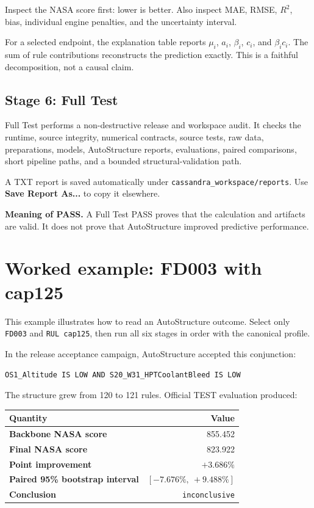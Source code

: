 \documentclass[11pt,a4paper]{article}
\begin{document}
Inspect the NASA score first: lower is better. Also inspect MAE, RMSE, $R^2$,
bias, individual engine penalties, and the uncertainty interval.

For a selected endpoint, the explanation table reports $\mu_i$, $a_i$,
$\beta_i$, $c_i$, and $\beta_i c_i$. The sum of rule contributions reconstructs
the prediction exactly. This is a faithful decomposition, not a causal claim.

\subsection{Stage 6: Full Test}

Full Test performs a non-destructive release and workspace audit. It checks the
runtime, source integrity, numerical contracts, source tests, raw data,
preparations, models, AutoStructure reports, evaluations, paired comparisons,
short pipeline paths, and a bounded structural-validation path.

A TXT report is saved automatically under \texttt{cassandra\_workspace/reports}.
Use \textbf{Save Report As...} to copy it elsewhere.

\begin{warningbox}
\textbf{Meaning of PASS.} A Full Test PASS proves that the calculation and
artifacts are valid. It does not prove that AutoStructure improved predictive
performance.
\end{warningbox}

\clearpage
\section{Worked example: FD003 with cap125}

This example illustrates how to read an AutoStructure outcome. Select only
\texttt{FD003} and \texttt{RUL cap125}, then run all six stages in order with the
canonical profile.

In the release acceptance campaign, AutoStructure accepted this conjunction:

\begin{importantbox}
\texttt{OS1\_Altitude IS LOW AND S20\_W31\_HPTCoolantBleed IS LOW}
\end{importantbox}

The structure grew from 120 to 121 rules. Official TEST evaluation produced:

\begin{center}
\begin{tabularx}{0.86\textwidth}{>{\bfseries}X r}
\toprule
Quantity & Value \\
\midrule
Backbone NASA score & 855.452 \\
Final NASA score & 823.922 \\
Point improvement & $+3.686\%$ \\
Paired 95\% bootstrap interval & $[-7.676\%,\ +9.488\%]$ \\
Conclusion & \texttt{inconclusive} \\
\bottomrule
\end{tabularx}
\end{center}
\end{document}
